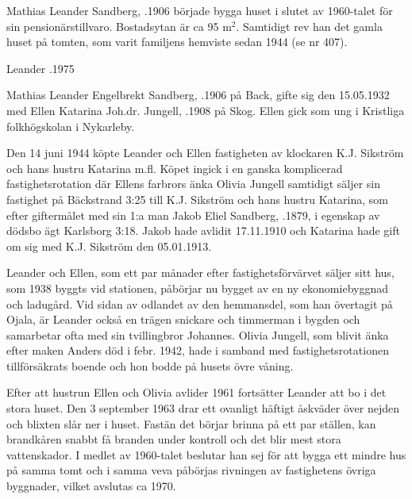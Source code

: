 {{{{%
%
Mathias Leander Sandberg, .1906 började bygga huset i slutet av 1960-talet för sin pensionärstillvaro. Bostadsytan är ca 95 m$^2$. Samtidigt rev han det gamla huset på tomten, som varit familjens hemviste sedan 1944 (se nr 407).

Leander .1975



%


%
Mathias Leander Engelbrekt Sandberg, .1906 på Back, gifte sig den 15.05.1932 med Ellen Katarina Joh.dr. Jungell, .1908 på Skog. Ellen gick som ung i Kristliga folkhögskolan i Nykarleby.

Den 14 juni 1944 köpte Leander och Ellen fastigheten av klockaren K.J. Sikström och hans hustru Katarina  m.fl. Köpet ingick i en ganska komplicerad fastighetsrotation där Ellens farbrors änka Olivia Jungell samtidigt säljer sin fastighet på Bäckstrand 3:25 till K.J. Sikström och hans hustru Katarina, som efter giftermålet med sin 1:a man Jakob Eliel Sandberg, .1879, i egenskap av dödsbo ägt Karlsborg 3:18. Jakob hade avlidit 17.11.1910 och Katarina hade gift om sig med K.J. Sikström den 05.01.1913.

Leander och Ellen, som ett par månader efter fastighetsförvärvet säljer sitt hus, som 1938 byggts vid stationen, påbörjar nu bygget av en ny ekonomiebyggnad och ladugård. Vid sidan av odlandet av den hemmansdel, som han övertagit på Ojala, är Leander också en trägen snickare och timmerman i bygden och samarbetar ofta med sin tvillingbror Johannes. Olivia Jungell, som blivit änka efter maken Anders död i febr. 1942, hade i samband med fastighetsrotationen tillförsäkrats boende och hon bodde på husets övre våning.

Efter att hustrun Ellen och Olivia avlider 1961 fortsätter Leander att bo i det stora huset. Den 3 september 1963 drar ett ovanligt häftigt åskväder över nejden och blixten slår ner i huset. Fastän det börjar brinna på ett par ställen, kan brandkåren snabbt få branden under kontroll och det blir mest stora vattenskador. I medlet av 1960-talet beslutar han sej för att bygga ett mindre hus på samma tomt och i samma veva påbörjas rivningen av fastighetens övriga byggnader, vilket avslutas ca 1970.
\begin{jhchildren}
  \item {}
  \item {}
\end{jhchildren}

}}}}
